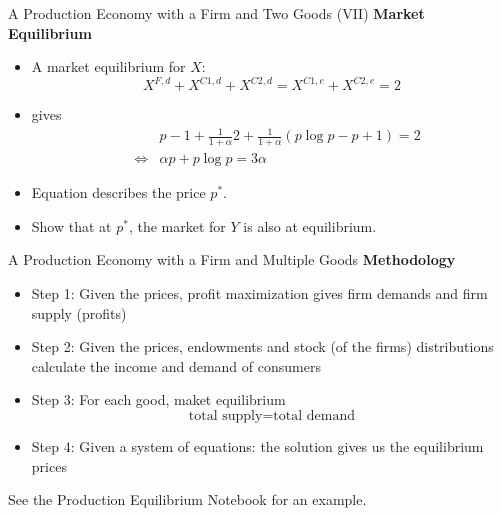 \documentclass[handout]{beamer}
\newenvironment{iPar}[1]{\textbf{#1} \begin{itemize}}{\end{itemize}}
\begin{document}
\begin{frame}{A Production Economy with a Firm and Two Goods (VII)}
\begin{iPar}{Market Equilibrium} \item A market equilibrium for $X$:
$$X^{F,d} + X^{C1,d} + X^{C2,d} = X^{C1,e} + X^{C2,e} = 2$$ \item gives
\begin{eqnarray*} & & p-1 + \frac{1}{1+\alpha}2 + \frac{1}{1+\alpha}(p\log p - p +1 ) = 2 \\
&\iff& \alpha p +p\log p = 3 \alpha\end{eqnarray*} \item Equation describes the price
$p^*$. \item Show that at $p^*$, the market for $Y$ is also at equilibrium.
\end{iPar}

\end{frame}

\begin{frame}{A Production Economy with a Firm and Multiple Goods}
\begin{iPar}{Methodology} \item[Step 1:] Given the prices, profit maximization gives firm demands and firm supply  (profits)  \pause  \item[Step 2:] Given the prices, endowments and stock (of the firms) distributions calculate the income and demand of consumers  \pause \item[Step 3:] For each good, maket equilibrium $$\textrm{total supply} =
\textrm{total demand}$$ \pause \item[Step 4:] Given a system of equations: the solution gives us the equilibrium prices \end{iPar} 

See the Production Equilibrium Notebook for an example. 

\end{frame}
\end{document}
